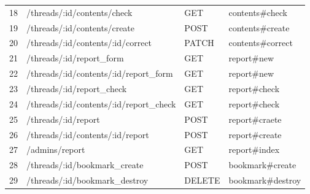 \documentclass[a4j]{jarticle}
\begin{document}
\begin{table}[htb]
\begin{tabular}{|c|l|l||l|}

	18 & /threads/:id/contents/check	& GET & contents\#check \\
	19 & /threads/:id/contents/create & POST  & contents\#create \\
	20 & /threads/:id/contents/:id/correct & PATCH & contents\#correct \\ \hline

  21 & /threads/:id/report\_form & GET & report\#new \\
  22 & /threads/:id/contents/:id/report\_form & GET & report\#new \\
  23 & /threads/:id/report\_check & GET & report\#check \\
  24 & /threads/:id/contents/:id/report\_check & GET & report\#check \\
  25 & /threads/:id/report & POST & report\#craete \\
  26 & /threads/:id/contents/:id/report & POST & report\#create \\
  27 & /admins/report & GET & report\#index \\ \hline

  28 & /threads/:id/bookmark\_create & POST & bookmark\#create \\
  29 & /threads/:id/bookmark\_destroy & DELETE & bookmark\#destroy \\ \hline

\end{tabular}

\end{table}
\end{document}
